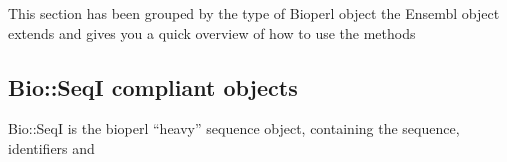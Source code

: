 \documentclass[11pt,a4paper]{article}
\begin{document}
This section has been grouped by the type of Bioperl object the Ensembl
object extends and gives you a quick overview of how to use the methods

\subsection{Bio::SeqI compliant objects}

Bio::SeqI is the bioperl ``heavy'' sequence object, containing the
sequence, identifiers and 
\end{document}
